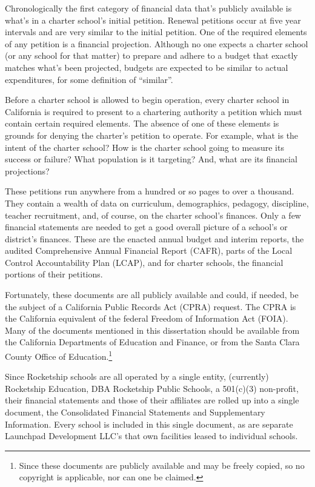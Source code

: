 Chronologically the first category of financial data that's publicly available is what's in a charter school's initial petition. Renewal petitions occur at five year intervals and are very similar to the initial petition. One of the required elements of any petition is a financial projection. Although no one expects a charter school (or any school for that matter) to prepare and adhere to a budget that exactly matches what's been projected, budgets are expected to be similar to actual expenditures, for some definition of ``similar''.

Before a charter school is allowed to begin operation, every charter school in California is required to present to a chartering authority a petition which must contain certain required elements. The absence of one of these elements is grounds for denying the charter's petition to operate. For example, what is the intent of the charter school? How is the charter school going to measure its success or failure? What population is it targeting? And, what are its financial projections?

These petitions run anywhere from a hundred or so pages to over a thousand. They contain a wealth of data on curriculum, demographics, pedagogy, discipline, teacher recruitment, and, of course, on the charter school's finances. Only a few financial statements are needed to get a good overall picture of a school's or district's finances. These are the enacted annual budget and interim reports, the audited Comprehensive Annual Financial Report (CAFR), parts of the Local Control Accountability Plan (LCAP), and for charter schools, the financial portions of their petitions.

Fortunately, these documents are all publicly available and could, if needed, be the subject of a California Public Records Act (CPRA) request. The CPRA is the California equivalent of the federal Freedom of Information Act (FOIA). Many of the documents mentioned in this dissertation should be available from the California Departments of Education and Finance, or from the Santa Clara County Office of Education.\footnote{Since these documents are publicly available and may be freely copied, so no copyright is applicable, nor can one be claimed.}

Since Rocketship schools are all operated by a single entity, (currently) Rocketship Education, DBA Rocketship Public Schools, a 501(c)(3) non-profit, their financial statements and those of their affiliates are rolled up into a single document, the Consolidated Financial Statements and Supplementary Information. Every school is included in this single document, as are separate Launchpad Development LLC's that own facilities leased to individual schools. %

